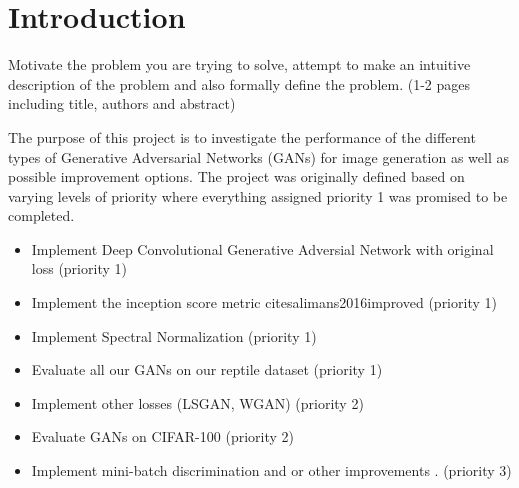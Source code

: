 \section{Introduction}
Motivate the problem you are trying to solve, attempt to make an intuitive description of the problem and also formally define the problem. (1-2 pages including title, authors and abstract)


 


The purpose of this project is to investigate the performance of the different types of Generative Adversarial Networks (GANs) \cite{goodfellow2014generative}  for image generation as well as possible improvement options.
The project was originally defined based on varying levels of priority where everything assigned priority 1 was promised to be completed.

\begin{itemize}
	\item Implement Deep Convolutional Generative Adversial Network with original loss \cite{DBLP:journals/corr/RadfordMC15} (priority 1)
	\item Implement the inception score metric cite{salimans2016improved} (priority 1)
	\item Implement Spectral Normalization (priority 1)
	\item Evaluate all our GANs on our reptile dataset (priority 1)
	\item Implement other losses (LSGAN, WGAN) \cite{mao2017least} (priority 2)
	\item Evaluate GANs on CIFAR-100 (priority 2)
	\item Implement mini-batch discrimination and or other improvements \cite{salimans2016improved}. (priority 3)
\end{itemize}

